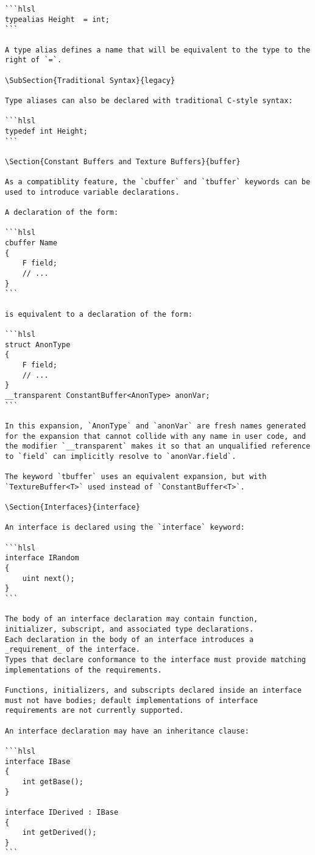 \begin{verbatim}
```hlsl
typealias Height  = int;
```

A type alias defines a name that will be equivalent to the type to the right of `=`.

\SubSection{Traditional Syntax}{legacy}

Type aliases can also be declared with traditional C-style syntax:

```hlsl
typedef int Height;
```

\Section{Constant Buffers and Texture Buffers}{buffer}

As a compatiblity feature, the `cbuffer` and `tbuffer` keywords can be used to introduce variable declarations.

A declaration of the form:

```hlsl
cbuffer Name
{
    F field;
    // ...
}
```

is equivalent to a declaration of the form:

```hlsl
struct AnonType
{
    F field;
    // ...
}
__transparent ConstantBuffer<AnonType> anonVar;
```

In this expansion, `AnonType` and `anonVar` are fresh names generated for the expansion that cannot collide with any name in user code, and the modifier `__transparent` makes it so that an unqualified reference to `field` can implicitly resolve to `anonVar.field`.

The keyword `tbuffer` uses an equivalent expansion, but with `TextureBuffer<T>` used instead of `ConstantBuffer<T>`.

\Section{Interfaces}{interface}

An interface is declared using the `interface` keyword:

```hlsl
interface IRandom
{
    uint next();
}
```

The body of an interface declaration may contain function, initializer, subscript, and associated type declarations.
Each declaration in the body of an interface introduces a _requirement_ of the interface.
Types that declare conformance to the interface must provide matching implementations of the requirements.

Functions, initializers, and subscripts declared inside an interface must not have bodies; default implementations of interface requirements are not currently supported.

An interface declaration may have an inheritance clause:

```hlsl
interface IBase
{
    int getBase();
}

interface IDerived : IBase
{
    int getDerived();
}
```


\end{verbatim}
